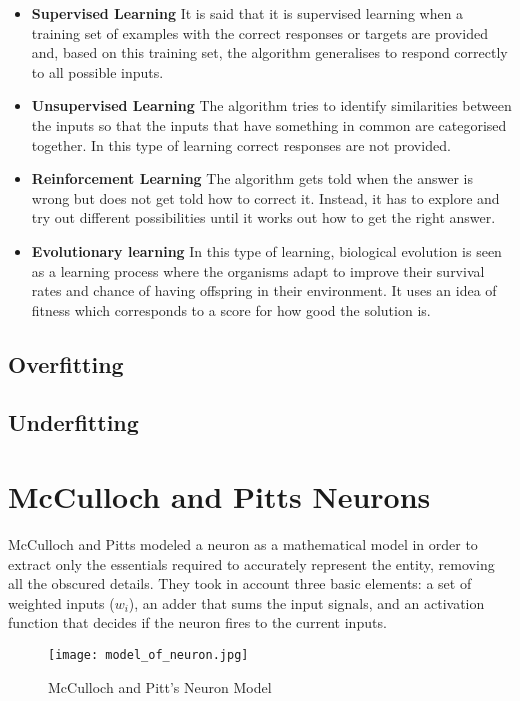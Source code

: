 \begin{itemize}
\item \textbf{Supervised Learning} It is said that it is supervised learning when a training set of examples with the correct responses or targets are provided and, based on this training set, the algorithm generalises to respond correctly to all possible inputs.

\item \textbf{Unsupervised Learning} The algorithm tries to identify similarities between the inputs so that the inputs that have something in common are categorised together. In this type of learning correct responses are not provided.

\item \textbf{Reinforcement Learning} The algorithm gets told when the answer is wrong but does not get told how to correct it. Instead, it has to explore and try out different possibilities until it works out how to get the right answer. 

\item \textbf{Evolutionary learning} In this type of learning, biological evolution is seen as a learning process where the organisms adapt to improve their survival rates and chance of having offspring in their environment. It uses an idea of fitness which corresponds to a score for how good the solution is. 
\end{itemize}

\subsection{Overfitting}
\subsection{Underfitting}

\section{McCulloch and Pitts Neurons}
McCulloch and Pitts modeled a neuron as a mathematical model in order to extract only the essentials required to accurately represent the entity, removing all the obscured details. They took in account three basic elements: a set of weighted inputs ($w_i$), an adder that sums the input signals, and an activation function that decides if the neuron fires to the current inputs.
\begin{figure}[h]
\centering
 
\texttt{[image: model\_of\_neuron.jpg]}
\caption{McCulloch and Pitt's Neuron Model}
\label{fig:neuron}
\end{figure}

